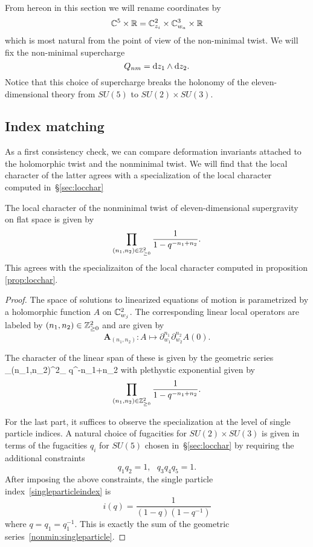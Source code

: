 From hereon in this section we will rename coordinates by
\[
\mathbb C^5 \times \mathbb R = \mathbb C^2_{z_i} \times \mathbb C^3_{w_a} \times \mathbb R
\]
which is most natural from the point of view of the non-minimal twist. 
We will fix the non-minimal supercharge 
\[
Q_{nm} = {\rm d} z_1 \wedge {\rm d} z_2 .
\]
Notice that this choice of supercharge breaks the holonomy of the eleven-dimensional theory from $SU(5)$ to $SU(2) \times SU(3)$. 

\subsection{Index matching}
\label{sec:indexcheck}

As a first consistency check, we can compare deformation invariants attached to the holomorphic twist and the nonminimal twist. We will find that the local character of the latter agrees with a specialization of the local character computed in~\S\ref{sec:locchar}

\begin{prop}
The  local character of the nonminimal twist of eleven-dimensional supergravity on flat space is given by
\[
\prod _{(n_1,n_2)\in \mathbb{Z}^2_{\geq 0}} \frac{1}{1-q^{-n_1+n_2}}.
\] 
This agrees with the specializaiton of the local character computed in proposition \ref{prop:locchar}.
\end{prop}
\begin{proof}
The space of solutions to linearized equations of motion is parametrized by a holomorphic function $A$ on $\mathbb{C}^2_{w_j}$. The corresponding linear local operators are labeled by $(n_1,n_2)\in \mathbb{Z}^2_{\geq 0}$  and are given by 
\[
\boldsymbol{A}_{(n_1,n_2)} : A \mapsto \partial_{w_1}^{n_1}\partial_{w_2}^{n_2} A (0).
\]

The character of the linear span of these is given by the geometric series
\beqn\label{nonmin:singleparticle}
\sum _{(n_1,n_2)\in \Z^2_{}} q^{-n_1+n_2}
\eeqn
with plethystic exponential given by 
\[
\prod _{(n_1,n_2)\in \mathbb{Z}^2_{\geq 0}} \frac{1}{1-q^{-n_1+n_2}}.
\]

For the last part, it suffices to observe the specialization at the level of single particle indices. A natural choice of fugacities for $SU(2)\times SU(3)$ is given in terms of the fugacities $q_i$ for $SU(5)$ chosen in~\S\ref{sec:locchar} by requiring the additional constraints \[q_1q_2 = 1, \ \ \ q_3q_4q_5=1.\]
After imposing the above constraints, the single particle index~\eqref{singleparticleindex} is
\[
i(q) = \frac{1}{(1-q)(1-q^{-1})}
\]
where $q = q_1=q_1^{-1}$. This is exactly the sum of the geometric series~\eqref{nonmin:singleparticle}.
\end{proof}

